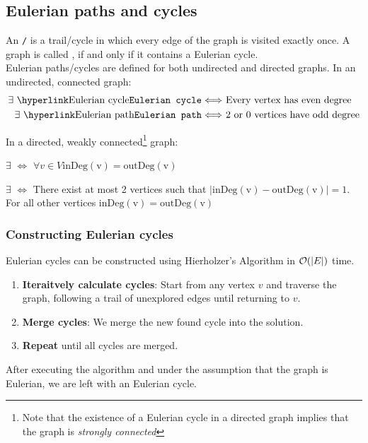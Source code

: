 \documentclass[a3paper, landscape, 11pt]{article} %
\begin{document}
\begin{multicols*}{4}
\newpage
\subsection*{Eulerian paths and cycles}
An \texttt{/} is a trail/cycle in which every edge of the graph is visited exactly once. A graph is called , if and only if it contains a Eulerian cycle.\\

Eulerian paths/cycles are defined for both undirected and directed graphs. In an undirected, connected graph:
\begin{align*}
	\text{$\exists$ \key{Eulerian cycle}} \Longleftrightarrow & \text{ Every vertex has even degree} \\
	\text{$\exists$ \key{Eulerian path}} \Longleftrightarrow & \text{ $2$ or $0$ vertices have odd degree}
\end{align*}	

In a directed, weakly connected\footnote{Note that the existence of a Eulerian cycle in a directed graph implies that the graph is \textit{strongly connected}} graph:

\bigskip
$\exists$  $\Longleftrightarrow$ $\forall v\in V \operatorname{inDeg(v)}=\operatorname{outDeg(v)}$ 

\smallskip
$\exists$  $\Longleftrightarrow$ There exist at most 2 vertices such that $| \operatorname{inDeg(v)}-\operatorname{outDeg(v)}| = 1$. For all other vertices $\operatorname{inDeg(v)} =\operatorname{outDeg(v)}$

\subsubsection*{Constructing Eulerian cycles}
Eulerian cycles can be constructed using Hierholzer's Algorithm in $\mathcal{O}(|E|)$ time.
\begin{enumerate}[noitemsep]
	\item \textbf{Iteraitvely calculate cycles}: Start from any vertex $v$ and traverse the graph, following a trail of unexplored edges until returning to $v$. 
	\item \textbf{Merge cycles}: We merge the new found cycle into the solution.
	\item \textbf{Repeat} until all cycles are merged.
\end{enumerate}
After executing the algorithm and under the assumption that the graph is Eulerian, we are left with an Eulerian cycle.


\end{multicols*}
\end{document}
